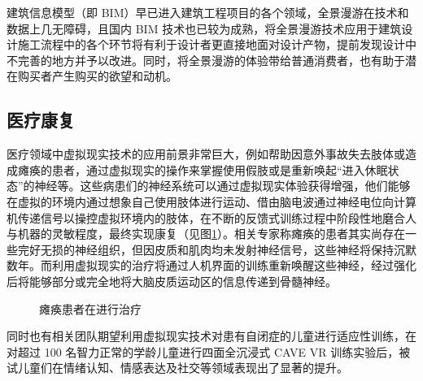 建筑信息模型（即 BIM）早已进入建筑工程项目的各个领域，全景漫游在技术和数据上几无障碍，且国内 BIM 技术也已较为成熟，将全景漫游技术应用于建筑设计施工流程中的各个环节将有利于设计者更直接地面对设计产物，提前发现设计中不完善的地方并予以改进。同时，将全景漫游的体验带给普通消费者，也有助于潜在购买者产生购买的欲望和动机。

\subsection{医疗康复}

医疗领域中虚拟现实技术的应用前景非常巨大，例如帮助因意外事故失去肢体或造成瘫痪的患者，通过虚拟现实的操作来掌握使用假肢或是重新唤起“进入休眠状态”的神经等。这些病患们的神经系统可以通过虚拟现实体验获得增强，他们能够在虚拟的环境内通过想象自己使用肢体进行运动、借由脑电波通过神经电位向计算机传递信号以操控虚拟环境内的肢体，在不断的反馈式训练过程中阶段性地磨合人与机器的灵敏程度，最终实现康复（见图\ref{fig:health}）。相关专家称瘫痪的患者其实尚存在一些完好无损的神经组织，但因皮质和肌肉均未发射神经信号，这些神经将保持沉默数年。而利用虚拟现实的治疗将通过人机界面的训练重新唤醒这些神经，经过强化后将能够部分或完全地将大脑皮质运动区的信息传递到骨髓神经。

\begin{figure}[htp]
\centering
{}
\caption{瘫痪患者在进行治疗}
\label{fig:health}
\end{figure}

同时也有相关团队期望利用虚拟现实技术对患有自闭症的儿童进行适应性训练，在对超过 100 名智力正常的学龄儿童进行四面全沉浸式 CAVE VR 训练实验后，被试儿童们在情绪认知、情感表达及社交等领域表现出了显著的提升。
